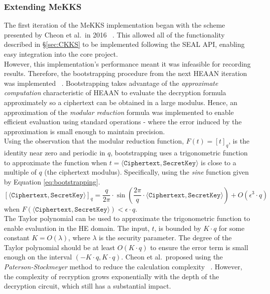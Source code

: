 \subsubsection{Extending MeKKS}
\indent \indent
The first iteration of the MeKKS implementation began with the scheme presented by Cheon et al.\ in 2016 ~\cite{CKKS}. This allowed all of the functionality described in §\ref{sec:CKKS} to be implemented following the SEAL API, enabling easy integration into the core project.
\smallskip \\ \indent
However, this implementation's performance meant it was infeasible for recording results. Therefore, the bootstrapping procedure from the next HEAAN iteration was implemented ~\cite{BootstrappingHEAAN}. Bootstrapping takes advantage of the \textit{approximate computation} characteristic of HEAAN to evaluate the decryption formula approximately so a ciphertext can be obtained in a large modulus. Hence, an approximation of the \textit{modular reduction} formula was implemented to enable efficient evaluation using standard operations - where the error induced by the approximation is small enough to maintain precision.
\smallskip \\ \indent
Using the observation that the modular reduction function, $F(t) = [t]_q$, is the identity near zero and periodic in $q$, bootstrapping uses a trigonometric function to approximate the function when $t = \langle \texttt{Ciphertext}, \texttt{SecretKey} \rangle$ is close to a multiple of $q$ (the ciphertext modulus). Specifically, using the \textit{sine} function given by Equation \ref{eq:bootstrapping}.
\begin{equation}
    \label{eq:bootstrapping}
    [\langle \texttt{Ciphertext}, \texttt{SecretKey} \rangle]_q = \frac{q}{2 \pi} \cdot \sin \left( \frac{2 \pi}{q} \cdot \langle \texttt{Ciphertext}, \texttt{SecretKey} \rangle \right) + O(\epsilon^3 \cdot q)
\end{equation}
when $F(\langle \texttt{Ciphertext}, \texttt{SecretKey} \rangle) < \epsilon \cdot q$.
\smallskip \\ \indent
The Taylor polynomial can be used to approximate the trigonometric function to enable evaluation in the HE domain. The input, $t$, is bounded by $K \cdot q$ for some constant $K = O(\lambda)$, where $\lambda$ is the security parameter. The degree of the Taylor polynomial should be at least $O(K \cdot q)$ to ensure the error term is small enough on the interval $(-K \cdot q, K \cdot q)$. Cheon et al.\ proposed using the \textit{Paterson-Stockmeyer} method to reduce the calculation complexity ~\cite{BootstrappingHEAAN, Paterson}. However, the complexity of recryption grows exponentially with the depth of the decryption circuit, which still has a substantial impact.
